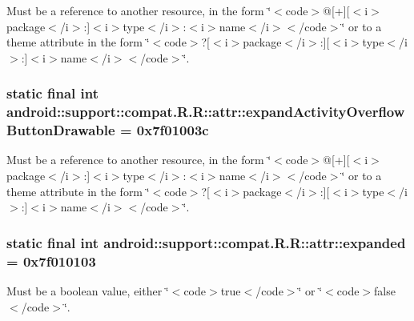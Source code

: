 Must be a reference to another resource, in the form \char`\"{}$<$code$>$@\mbox{[}+\mbox{]}\mbox{[}$<$i$>$package$<$/i$>$:\mbox{]}$<$i$>$type$<$/i$>$:$<$i$>$name$<$/i$>$$<$/code$>$\char`\"{} or to a theme attribute in the form \char`\"{}$<$code$>$?\mbox{[}$<$i$>$package$<$/i$>$:\mbox{]}\mbox{[}$<$i$>$type$<$/i$>$:\mbox{]}$<$i$>$name$<$/i$>$$<$/code$>$\char`\"{}. \hypertarget{classandroid_1_1support_1_1compat_1_1_r_1_1attr_3e16abfa0e72070144f02ddea2d864cc}{
\subsubsection[{expandActivityOverflowButtonDrawable}]{\setlength{\rightskip}{0pt plus 5cm}static final int android::support::compat.R.R::attr::expandActivityOverflowButtonDrawable = 0x7f01003c}}
\label{classandroid_1_1support_1_1compat_1_1_r_1_1attr_3e16abfa0e72070144f02ddea2d864cc}


Must be a reference to another resource, in the form \char`\"{}$<$code$>$@\mbox{[}+\mbox{]}\mbox{[}$<$i$>$package$<$/i$>$:\mbox{]}$<$i$>$type$<$/i$>$:$<$i$>$name$<$/i$>$$<$/code$>$\char`\"{} or to a theme attribute in the form \char`\"{}$<$code$>$?\mbox{[}$<$i$>$package$<$/i$>$:\mbox{]}\mbox{[}$<$i$>$type$<$/i$>$:\mbox{]}$<$i$>$name$<$/i$>$$<$/code$>$\char`\"{}. \hypertarget{classandroid_1_1support_1_1compat_1_1_r_1_1attr_cfbb49829270c487f9703da318279b72}{
\subsubsection[{expanded}]{\setlength{\rightskip}{0pt plus 5cm}static final int android::support::compat.R.R::attr::expanded = 0x7f010103}}
\label{classandroid_1_1support_1_1compat_1_1_r_1_1attr_cfbb49829270c487f9703da318279b72}


Must be a boolean value, either \char`\"{}$<$code$>$true$<$/code$>$\char`\"{} or \char`\"{}$<$code$>$false$<$/code$>$\char`\"{}. 

